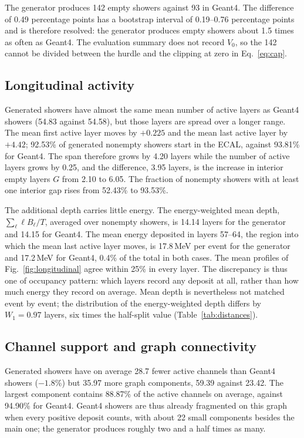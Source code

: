\documentclass[11pt]{article}
\begin{document}
The generator produces 142 empty showers against 93 in Geant4. The difference of 0.49 percentage points has a bootstrap interval of 0.19--0.76 percentage points and is therefore resolved: the generator produces empty showers about 1.5 times as often as Geant4. The evaluation summary does not record $V_0$, so the 142 cannot be divided between the hurdle and the clipping at zero in Eq.~\eqref{eq:cap}.

\subsection{Longitudinal activity}

Generated showers have almost the same mean number of active layers as Geant4 showers (54.83 against 54.58), but those layers are spread over a longer range. The mean first active layer moves by $+0.225$ and the mean last active layer by $+4.42$; 92.53\% of generated nonempty showers start in the ECAL, against 93.81\% for Geant4. The span therefore grows by 4.20 layers while the number of active layers grows by 0.25, and the difference, 3.95 layers, is the increase in interior empty layers $G$ from 2.10 to 6.05. The fraction of nonempty showers with at least one interior gap rises from 52.43\% to 93.53\%.

The additional depth carries little energy. The energy-weighted mean depth, $\sum_\ell\ell B_\ell/T$, averaged over nonempty showers, is 14.14 layers for the generator and 14.15 for Geant4. The mean energy deposited in layers 57--64, the region into which the mean last active layer moves, is 17.8\,MeV per event for the generator and 17.2\,MeV for Geant4, 0.4\% of the total in both cases. The mean profiles of Fig.~\ref{fig:longitudinal} agree within 25\% in every layer. The discrepancy is thus one of occupancy pattern: which layers record any deposit at all, rather than how much energy they record on average. Mean depth is nevertheless not matched event by event; the distribution of the energy-weighted depth differs by $W_1=0.97$ layers, six times the half-split value (Table~\ref{tab:distances}).

\subsection{Channel support and graph connectivity}

Generated showers have on average 28.7 fewer active channels than Geant4 showers ($-1.8\%$) but 35.97 more graph components, 59.39 against 23.42. The largest component contains 88.87\% of the active channels on average, against 94.90\% for Geant4. Geant4 showers are thus already fragmented on this graph when every positive deposit counts, with about 22 small components besides the main one; the generator produces roughly two and a half times as many.
\end{document}

